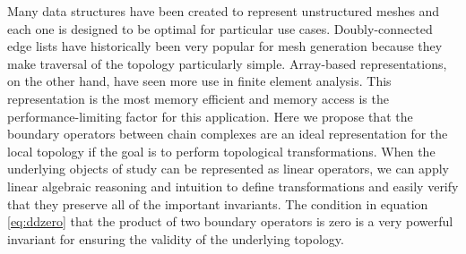 \documentclass[twocolumn]{article}
\begin{document}
Many data structures have been created to represent unstructured meshes and each one is designed to be optimal for particular use cases.
Doubly-connected edge lists have historically been very popular for mesh generation because they make traversal of the topology particularly simple.
Array-based representations, on the other hand, have seen more use in finite element analysis.
This representation is the most memory efficient and memory access is the performance-limiting factor for this application.
Here we propose that the boundary operators between chain complexes are an ideal representation for the local topology if the goal is to perform topological transformations.
When the underlying objects of study can be represented as linear operators, we can apply linear algebraic reasoning and intuition to define transformations and easily verify that they preserve all of the important invariants.
The condition in equation \eqref{eq:ddzero} that the product of two boundary operators is zero is a very powerful invariant for ensuring the validity of the underlying topology.



\end{document}
